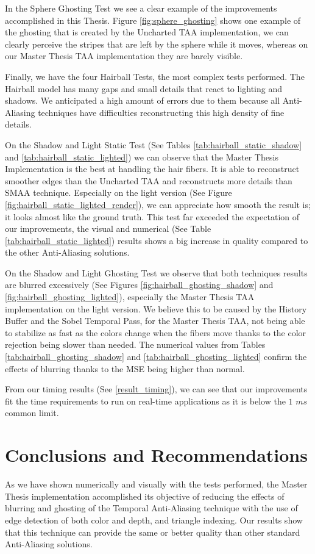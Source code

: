 \documentclass{cslthse-msc}
\begin{document}
In the Sphere Ghosting Test we see a clear example of the improvements accomplished in this Thesis. Figure \ref{fig:sphere_ghosting} shows one example of the ghosting that is created by the Uncharted TAA implementation, we can clearly perceive the stripes that are left by the sphere while it moves, whereas on our Master Thesis TAA implementation they are barely visible.

Finally, we have the four Hairball Tests, the most complex tests performed. The Hairball model has many gaps and small details that react to lighting and shadows. We anticipated a high amount of errors due to them because all Anti-Aliasing techniques have difficulties reconstructing this high density of fine details. 

On the Shadow and Light Static Test (See Tables \ref{tab:hairball_static_shadow} and \ref{tab:hairball_static_lighted}) we can observe that the Master Thesis Implementation is the best at handling the hair fibers. It is able to reconstruct smoother edges than the Uncharted TAA and reconstructs more details than SMAA technique. Especially on the light version (See Figure \ref{fig:hairball_static_lighted_render}), we can appreciate how smooth the result is; it looks almost like the ground truth. This test far exceeded the expectation of our improvements, the visual and numerical (See Table \ref{tab:hairball_static_lighted}) results shows a big increase in quality compared to the other Anti-Aliasing solutions.

On the Shadow and Light Ghosting Test we observe that both techniques results are blurred excessively (See Figures \ref{fig:hairball_ghosting_shadow} and \ref{fig:hairball_ghosting_lighted}), especially the Master Thesis TAA implementation on the light version. We believe this to be caused by the History Buffer and the Sobel Temporal Pass, for the Master Thesis TAA, not being able to stabilize as fast as the colors change when the fibers move thanks to the color rejection being slower than needed. The numerical values from Tables \ref{tab:hairball_ghosting_shadow} and \ref{tab:hairball_ghosting_lighted} confirm the effects of blurring thanks to the MSE being higher than normal.


From our timing results (See \ref{result_timing}), we can see that our improvements fit the time requirements to run on real-time applications as it is below the $1$ $ms$ common limit.


\chapter{Conclusions and Recommendations}
As we have shown numerically and visually with the tests performed, the Master Thesis implementation accomplished its objective of reducing the effects of blurring and ghosting of the Temporal Anti-Aliasing technique with the use of edge detection of both color and depth, and triangle indexing. Our results show that this technique can provide the same or better quality than other standard Anti-Aliasing solutions. 
\end{document}
